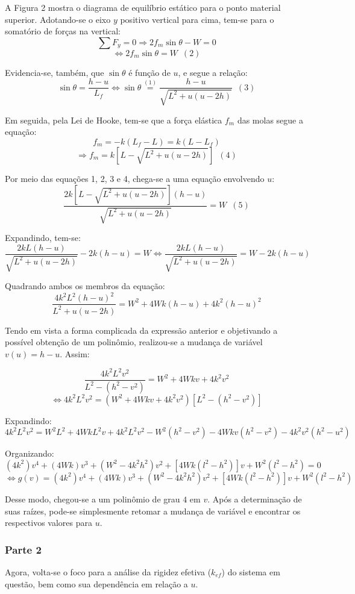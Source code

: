 \documentclass[a4paper, 12pt]{article}
\begin{document}
	A Figura 2 mostra o diagrama de equilíbrio estático para o ponto material superior. Adotando-se o eixo $y$ positivo 
	vertical para cima, tem-se para o somatório de forças na vertical:
	$$\sum F_y=0\Longrightarrow 2f_m\sin \theta -W=0$$ $$\Longleftrightarrow 2f_m\sin \theta =W\,\,\,(2)$$
	
	Evidencia-se, também, que $\sin \theta$ é função de $u$, e segue a relação:
	$$\sin \theta = \frac{h-u}{L_f}\Longleftrightarrow \sin \theta \stackrel{(1)}{=} 
	\frac{h-u}{\sqrt{L^2+u(u-2h)}}\,\,\,(3)$$
	
	Em seguida, pela Lei de Hooke, tem-se que a força elástica $f_m$ das molas segue a equação:
	$$f_m=-k(L_f-L)=k(L-L_f)$$ $$\Longrightarrow f_m=k\left[L-\sqrt{L^2+u(u-2h)}\right]\,\,\,(4)$$
	
	Por meio das equações 1, 2, 3 e 4, chega-se a uma equação envolvendo $u$:
	$$\frac{2k\left[L-\sqrt{L^2+u(u-2h)}\right](h-u)}{\sqrt{L^2+u(u-2h)}}=W\,\,\,(5)$$
	
	\newpage
	
	Expandindo, tem-se: $$\frac{2kL(h-u)}{\sqrt{L^2+u(u-2h)}}-2k(h-u)=W \Longleftrightarrow 
	\frac{2kL(h-u)}{\sqrt{L^2+u(u-2h)}}=W-2k(h-u)$$
	
	Quadrando ambos os membros da equação: $$\frac{4k^2L^2(h-u)^2}{L^2+u(u-2h)}=W^2+4Wk(h-u)+4k^2(h-u)^2$$
	
	Tendo em vista a forma complicada da expressão anterior e objetivando a possível obtenção de um polinômio, 
	realizou-se a mudança de variável $v(u)=h-u$. Assim:
	
	$$\frac{4k^2L^2v^2}{L^2-(h^2-v^2)}=W^2+4Wkv+4k^2v^2$$ 
	$$\Longleftrightarrow 4k^2L^2v^2=(W^2+4Wkv+4k^2v^2)[L^2-(h^2-v^2)]$$
	
	Expandindo: $$4k^2L^2v^2=W^2L^2+4WkL^2v+4k^2L^2v^2-W^2(h^2-v^2)-4Wkv(h^2-v^2)-4k^2v^2(h^2-u^2)$$
	
	Organizando: $$(4k^2)v^4+(4Wk)v^3+(W^2-4k^2h^2)v^2+[4Wk(l^2-h^2)]v+W^2(l^2-h^2)=0$$
	$$\Longleftrightarrow g(v)=(4k^2)v^4+(4Wk)v^3+(W^2-4k^2h^2)v^2+[4Wk(l^2-h^2)]v+W^2(l^2-h^2)$$
	
	Desse modo, chegou-se a um polinômio de grau $4$ em $v$. Após a determinação de suas raízes, pode-se simplesmente 
	retomar a mudança de variável e encontrar os respectivos valores para $u$.
	
	\subsubsection{Parte 2}
	
	Agora, volta-se o foco para a análise da rigidez efetiva ($k_{ef}$) do sistema em questão, bem como sua dependência 
	em relação a $u$.
	
\end{document}
